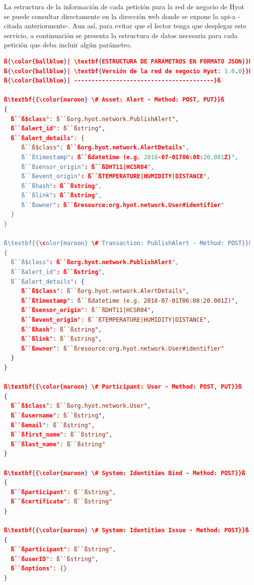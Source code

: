\documentclass[12pt,a4paper, twoside]{report}
\begin{document}
La estructura de la información de cada petición para la red de negocio de Hyot se puede consultar directamente en la dirección web donde se expone la \gls{api-a} -citada anteriormente-. Aun así, para evitar que el lector tenga que desplegar este servicio, a continuación se presenta la estructura de datos necesaria para cada petición que deba incluir algún parámetro. \\

\begin{lstlisting}[language=json, basicstyle=\ttfamily\footnotesize, numbers=none, escapechar=ß]
ß{\color{ballblue}| \textbf{ESTRUCTURA DE PARÁMETROS EN FORMATO JSON}}ß
ß{\color{ballblue}| \textbf{Versión de la red de negocio Hyot: 1.0.0}}ß
ß{\color{ballblue}| ----------------------------------------}ß

ß\textbf{{\color{maroon} \# Asset: Alert - Method: POST, PUT}}ß
{
  ß``ß$class": ß``ßorg.hyot.network.PublishAlert",
  ß``ßalert_id": ß``ßstring",
  ß``ßalert_details": {
     ß``ß$class": ß``ßorg.hyot.network.AlertDetails",
     ß``ßtimestamp": ß``ßdatetime (e.g. 2018-07-01T06:08:20.001Z)",
     ß``ßsensor_origin": ß``ßDHT11|HCSR04",
     ß``ßevent_origin": ß``ßTEMPERATURE|HUMIDITY|DISTANCE",
     ß``ßhash": ß``ßstring",
     ß``ßlink": ß``ßstring",
     ß``ßowner": ß``ßresource:org.hyot.network.User#identifier"
  }
}

ß\textbf{{\color{maroon} \# Transaction: PublishAlert - Method: POST}}ß
{
  ß``ß$class": ß``ßorg.hyot.network.PublishAlert",
  ß``ßalert_id": ß``ßstring",
  ß``ßalert_details": {
     ß``ß$class": ß``ßorg.hyot.network.AlertDetails",
     ß``ßtimestamp": ß``ßdatetime (e.g. 2018-07-01T06:08:20.001Z)",
     ß``ßsensor_origin": ß``ßDHT11|HCSR04",
     ß``ßevent_origin": ß``ßTEMPERATURE|HUMIDITY|DISTANCE",
     ß``ßhash": ß``ßstring",
     ß``ßlink": ß``ßstring",
     ß``ßowner": ß``ßresource:org.hyot.network.User#identifier"
  }
}
            
ß\textbf{{\color{maroon} \# Participant: User - Method: POST, PUT}}ß
{
  ß``ß$class": ß``ßorg.hyot.network.User",
  ß``ßusername": ß``ßstring",
  ß``ßemail": ß``ßstring",
  ß``ßfirst_name": ß``ßstring",
  ß``ßlast_name": ß``ßstring"
}

ß\textbf{{\color{maroon} \# System: Identities Bind - Method: POST}}ß
{
  ß``ßparticipant": ß``ßstring",
  ß``ßcertificate": ß``ßstring"
}

ß\textbf{{\color{maroon} \# System: Identities Issue - Method: POST}}ß
{
  ß``ßparticipant": ß``ßstring",
  ß``ßuserID": ß``ßstring",
  ß``ßoptions": {}
}

\end{lstlisting}
\end{document}
